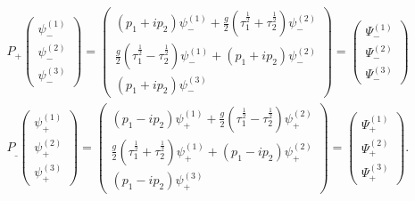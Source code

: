 \begin{equation}
\label{7} 
\begin{array}{c}
P_{+}\left( 
\begin{array}{c}
\psi _{-}^{(1)} \\ 
\psi _{-}^{(2)} \\ 
\psi _{-}^{(3)} 
\end{array}
\right) =\left( 
\begin{array}{c}
\left( p_1+ip_2\right) \psi _{-}^{(1)}+\frac g2\left( \tau _1^{\frac
12}+\tau _2^{\frac 12}\right) \psi _{-}^{(2)} \\ 
\frac g2\left( \tau _1^{\frac 12}-\tau _2^{\frac 12}\right) \psi
_{-}^{(1)}+\left( p_1+ip_2\right) \psi _{-}^{(2)} \\ 
\left( p_1+ip_2\right) \psi _{-}^{(3)} 
\end{array}
\right) =\left( 
\begin{array}{c}
\Psi _{-}^{(1)} \\ 
\Psi _{-}^{(2)} \\ 
\Psi _{-}^{(3)} 
\end{array}
\right) \\ 
P_{\_}\left( 
\begin{array}{c}
\psi _{+}^{(1)} \\ 
\psi _{+}^{(2)} \\ 
\psi _{+}^{(3)} 
\end{array}
\right) =\left( 
\begin{array}{c}
\left( p_1-ip_2\right) \psi _{+}^{(1)}+\frac g2\left( \tau _1^{\frac
12}-\tau _2^{\frac 12}\right) \psi _{+}^{(2)} \\ 
\frac g2\left( \tau _1^{\frac 12}+\tau _2^{\frac 12}\right) \psi
_{+}^{(1)}+\left( p_1-ip_2\right) \psi _{+}^{(2)} \\ 
\left( p_1-ip_2\right) \psi _{+}^{(3)} 
\end{array}
\right) =\left( 
\begin{array}{c}
\Psi _{+}^{(1)} \\ 
\Psi _{+}^{(2)} \\ 
\Psi _{+}^{(3)} 
\end{array}
\right) . 
\end{array}
\end{equation}

